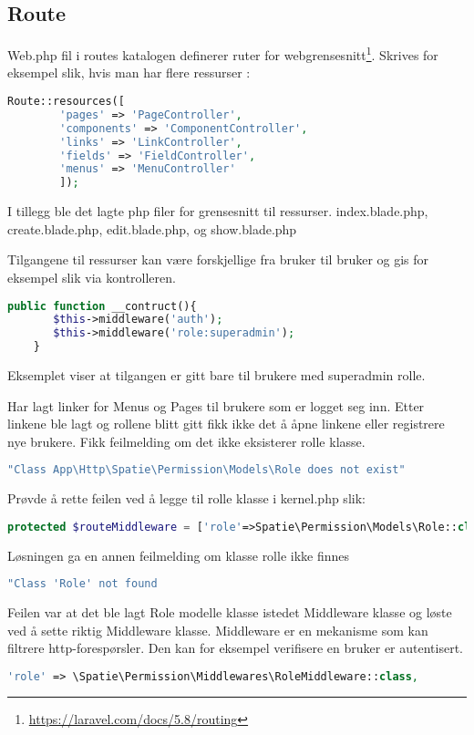 \subsection{Route}
Web.php fil i routes katalogen definerer  ruter  for webgrensesnitt\footnote{\url{https://laravel.com/docs/5.8/routing}}.
Skrives for eksempel slik, hvis man har flere ressurser :
\begin{lstlisting}[language=PHP]
    Route::resources([
        'pages' => 'PageController',
        'components' => 'ComponentController',
        'links' => 'LinkController',
        'fields' => 'FieldController',
        'menus' => 'MenuController'
        ]);
\end{lstlisting}

I tillegg ble det lagte php filer for grensesnitt til ressurser. index.blade.php, create.blade.php, edit.blade.php, og show.blade.php
\cite{savani2018lcrud}

Tilgangene til ressurser kan være forskjellige fra bruker til bruker og gis for eksempel slik via kontrolleren.
\begin{lstlisting}[language=PHP]
    public function __contruct(){
       $this->middleware('auth');
       $this->middleware('role:superadmin');
    }
\end{lstlisting}

Eksemplet viser at tilgangen er gitt bare til brukere med superadmin rolle.

Har lagt linker for Menus og Pages til brukere som er logget seg inn.
Etter linkene ble lagt og rollene blitt gitt fikk ikke det å åpne linkene eller registrere nye brukere. Fikk feilmelding om det ikke eksisterer rolle klasse. 
\begin{lstlisting}[language=PHP]
    "Class App\Http\Spatie\Permission\Models\Role does not exist"
\end{lstlisting}
 
Prøvde å rette feilen ved å legge til rolle klasse i kernel.php slik:
\begin{lstlisting}[language=PHP]
   protected $routeMiddleware = ['role'=>Spatie\Permission\Models\Role::class]; 
\end{lstlisting}  
Løsningen ga en annen feilmelding om klasse rolle ikke finnes
 \begin{lstlisting}[language=PHP]
      "Class 'Role' not found
 \end{lstlisting}

Feilen var at det ble lagt Role modelle klasse istedet Middleware klasse og løste ved å sette riktig Middleware klasse. Middleware \cite{laravel2019mw} er en mekanisme som kan  filtrere http-forespørsler. Den kan for eksempel verifisere en bruker er autentisert. 
\begin{lstlisting}[language=PHP]
   'role' => \Spatie\Permission\Middlewares\RoleMiddleware::class,
\end{lstlisting}

